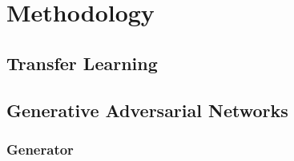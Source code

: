 \section{Methodology}

\subsection{Transfer Learning}

\lipsum[3]

\subsection{Generative Adversarial Networks}

\lipsum[1]

\subsubsection{Generator}

\lipsum[6]